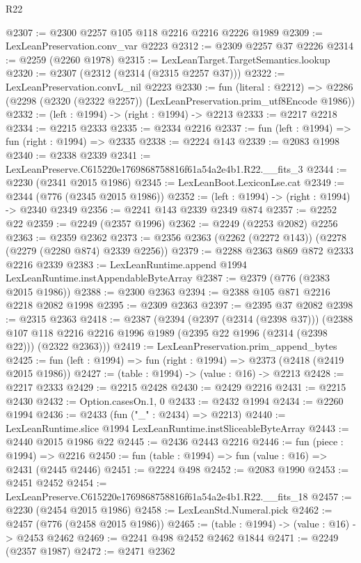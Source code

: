 \begin{lexlean}{R22}
\begin{coremodule}
@2307 := @2300 @2257 @105 @118 @2216 @2216 @2226 @1989
@2309 := LexLeanPreservation.conv_var @2223
@2312 := @2309 @2257 @37 @2226
@2314 := @2259 (@2260 @1978)
@2315 := LexLeanTarget.TargetSemantics.lookup
@2320 := @2307 (@2312 (@2314 (@2315 @2257 @37)))
@2322 := LexLeanPreservation.convL_nil @2223
@2330 := fun (literal : @2212) =>
  @2286 (@2298 (@2320 (@2322 @2257)) (LexLeanPreservation.prim_utf8Encode @1986))
@2332 := (left : @1994) -> (right : @1994) -> @2213
@2333 := @2217 @2218
@2334 := @2215 @2333
@2335 := @2334 @2216
@2337 := fun (left : @1994) => fun (right : @1994) => @2335
@2338 := @2224 @143
@2339 := @2083 @1998
@2340 := @2338 @2339
@2341 := LexLeanPreserve.C615220e1769868758816f61a54a2e4b1.R22.__fits_3
@2344 := @2230 (@2341 @2015 @1986)
@2345 := LexLeanBoot.LexiconLse.cat
@2349 := @2344 (@776 (@2345 @2015 @1986))
@2352 := (left : @1994) -> (right : @1994) -> @2340 @2349
@2356 := @2241 @143 @2339 @2349 @874
@2357 := @2252 @22
@2359 := @2249 (@2357 @1996)
@2362 := @2249 (@2253 @2082) @2256
@2363 := @2359 @2362
@2373 := @2356 @2363 (@2262 (@2272 @143)) (@2278 (@2279 (@2280 @874) @2339 @2256))
@2379 := @2288 @2363 @869 @872 @2333 @2216 @2339
@2383 := LexLeanRuntime.append @1994 LexLeanRuntime.instAppendableByteArray
@2387 := @2379 (@776 (@2383 @2015 @1986))
@2388 := @2300 @2363
@2394 := @2388 @105 @871 @2216 @2218 @2082 @1998
@2395 := @2309 @2363
@2397 := @2395 @37 @2082
@2398 := @2315 @2363
@2418 := @2387
    (@2394
      (@2397 (@2314 (@2398 @37)))
      (@2388 @107 @118 @2216 @2216 @1996 @1989 (@2395 @22 @1996 (@2314 (@2398 @22))) (@2322 @2363)))
@2419 := LexLeanPreservation.prim_append_bytes
@2425 := fun (left : @1994) => fun (right : @1994) => @2373 (@2418 (@2419 @2015 @1986))
@2427 := (table : @1994) -> (value : @16) -> @2213
@2428 := @2217 @2333
@2429 := @2215 @2428
@2430 := @2429 @2216
@2431 := @2215 @2430
@2432 := Option.casesOn.{1, 0}
@2433 := @2432 @1994
@2434 := @2260 @1994
@2436 := @2433 (fun ("_" : @2434) => @2213)
@2440 := LexLeanRuntime.slice @1994 LexLeanRuntime.instSliceableByteArray
@2443 := @2440 @2015 @1986 @22
@2445 := @2436 @2443 @2216
@2446 := fun (piece : @1994) => @2216
@2450 := fun (table : @1994) => fun (value : @16) => @2431 (@2445 @2446)
@2451 := @2224 @498
@2452 := @2083 @1990
@2453 := @2451 @2452
@2454 := LexLeanPreserve.C615220e1769868758816f61a54a2e4b1.R22.__fits_18
@2457 := @2230 (@2454 @2015 @1986)
@2458 := LexLeanStd.Numeral.pick
@2462 := @2457 (@776 (@2458 @2015 @1986))
@2465 := (table : @1994) -> (value : @16) -> @2453 @2462
@2469 := @2241 @498 @2452 @2462 @1844
@2471 := @2249 (@2357 @1987)
@2472 := @2471 @2362

\end{coremodule}
\end{lexlean}
